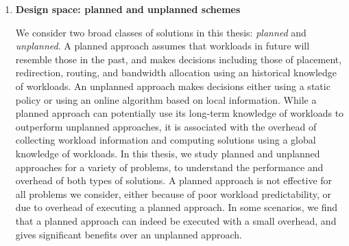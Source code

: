 \begin{enumerate}
\item
\textbf{Design space: planned and unplanned schemes}

We consider two broad classes of solutions in this thesis: \emph{planned}  and \emph{unplanned}.
A planned approach assumes that  workloads in future will resemble those in the past, and makes decisions including those of  placement, redirection,  routing, and bandwidth allocation using an historical knowledge of workloads. An unplanned approach makes decisions either using a static policy or using an online algorithm based on local information. 
While a planned approach can potentially use its long-term knowledge of workloads to outperform unplanned approaches, it is associated with the overhead of collecting workload information and computing solutions using a global knowledge of workloads. 
In this thesis, we study planned and unplanned approaches for a variety of problems, to understand the performance and overhead of both types of solutions. 
A planned approach is not  effective for all problems we consider, either because of poor workload predictability, or due to overhead of executing a planned approach. In some scenarios, we find that  a planned approach can indeed be executed with a small overhead, and gives significant benefits over an unplanned approach. 










\end{enumerate}

